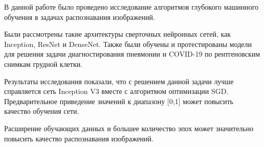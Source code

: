 В данной работе было проведено исследование алгоритмов глубокого машинного обучения в задачах распознавания изображений. 

Были рассмотрены такие архитектуры сверточных нейронных сетей, как Inception, ResNet и DenseNet. Также были обучены и протестированы модели для решения задачи диагностирования пневмонии и COVID-19 по рентгеновским снимкам грудной клетки. 

Результаты исследования показали, что с решением данной задачи лучше справляется сеть Inception V3 вместе с алгоритмом оптимизации SGD. Предварительное приведение значений к диапазону [0;1] может повысить качество обучения сети. 

Расширение обучающих данных и большее количество эпох может значительно повысить качество распознавания изображений.

\clearpage